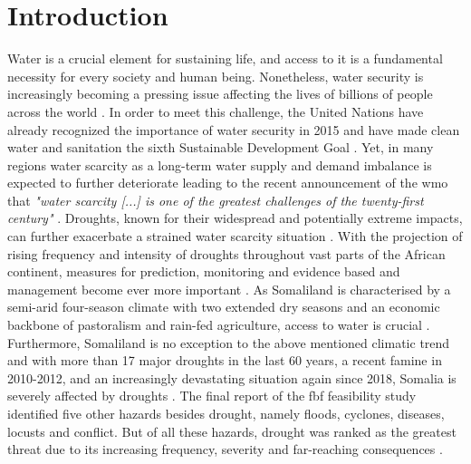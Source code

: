 
\chapter{Introduction} %

\label{Chapter1} 

Water is a crucial element for sustaining life, and access to it is a fundamental necessity for every society and human being. Nonetheless, water security is increasingly becoming a pressing issue affecting the lives of billions of people across the world \autocite{caretta2022water}. In order to meet this challenge, the United Nations have already recognized the importance of water security in 2015 and have made clean water and sanitation the sixth Sustainable Development Goal \autocite{unGoalEnsureAvailability2016}. Yet, in many regions water scarcity as a long-term water supply and demand imbalance is expected to further deteriorate leading to the recent announcement of the \acrlong{wmo} that \textit{"water scarcity [...] is one of the greatest challenges of the twenty-first century"} \autocite[7]{idmpDroughtWaterScarcity2022}.\newline
Droughts, known for their widespread and potentially extreme impacts, can further exacerbate a strained water scarcity situation \autocite{idmpDroughtWaterScarcity2022}. With the projection of rising frequency and intensity of droughts throughout vast parts of the African continent, measures for prediction, monitoring and evidence based  and management become ever more important \autocite{abdulkadirAssessmentDroughtRecurrence2017,trisosAfrica2022,undrrSpecialReportDrought2021}.\newline
As Somaliland is characterised by a semi-arid four-season climate with two extended dry seasons and an economic backbone of pastoralism and rain-fed agriculture, access to water is crucial \autocite{abdulkadirAssessmentDroughtRecurrence2017,petrucciLandscapeLandformsNorthern2022,republicofsomaliaRepublicSomalilandCountry2021}. Furthermore, Somaliland is no exception to the above mentioned climatic trend and with more than 17 major droughts in the last 60 years, a recent famine in 2010-2012, and an increasingly devastating situation again since 2018, Somalia is severely affected by droughts \autocite{abdulkadirAssessmentDroughtRecurrence2017,credEMDATInternationalDisasters2023}. The final report of the \acrfull{fbf} feasibility study identified five other hazards besides drought, namely floods, cyclones, diseases, locusts and conflict. But of all these hazards, drought was ranked as the greatest threat due to its increasing frequency, severity and far-reaching consequences \autocite{scrsFeasibilityStudyPotential2022}.\newline

